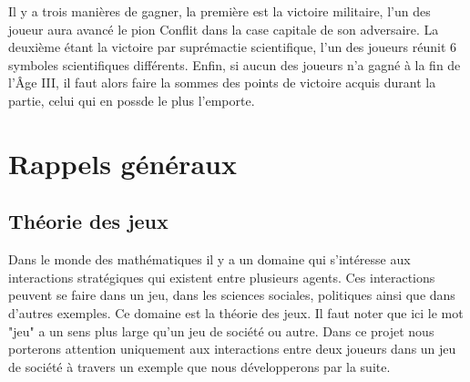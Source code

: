 \documentclass[12pt]{article}
\begin{document}
    	Il y a trois manières de gagner, la première est la victoire militaire, l'un des joueur aura avancé le pion Conflit dans la case capitale de son adversaire. La deuxième étant la victoire par suprémactie scientifique, l'un des joueurs réunit 6 symboles scientifiques différents. Enfin, si aucun des joueurs n'a gagné à la fin de l'Âge III, il faut alors faire la sommes des points de victoire acquis durant la partie, celui qui en possde le plus l'emporte.

	\section{Rappels généraux}
	\subsection{Théorie des jeux}
    	Dans le monde des mathématiques il y a un domaine qui s'intéresse aux interactions stratégiques qui existent entre plusieurs agents. Ces interactions peuvent se faire dans un jeu, dans les sciences sociales, politiques ainsi que dans d'autres exemples. Ce domaine est la théorie des jeux\cite{wiki_theorie_jeux}. Il faut noter que ici le mot "jeu" a un sens plus large qu'un jeu de société ou autre. Dans ce projet nous porterons attention uniquement aux interactions entre deux joueurs dans un jeu de société à travers un exemple que nous développerons par la suite.
\end{document}
